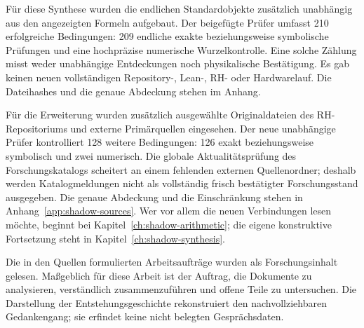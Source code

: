 \documentclass[11pt,a4paper,oneside,parskip=half,headings=normal]{scrreprt}
\begin{document}
Für diese Synthese wurden die endlichen Standardobjekte zusätzlich unabhängig aus den angezeigten Formeln aufgebaut. Der beigefügte Prüfer umfasst 210 erfolgreiche Bedingungen: 209 endliche exakte beziehungsweise symbolische Prüfungen und eine hochpräzise numerische Wurzelkontrolle. Eine solche Zählung misst weder unabhängige Entdeckungen noch physikalische Bestätigung. Es gab keinen neuen vollständigen Repository-, Lean-, RH- oder Hardwarelauf. Die Dateihashes und die genaue Abdeckung stehen im Anhang.

Für die Erweiterung wurden zusätzlich ausgewählte Originaldateien des RH-Repositoriums und externe Primärquellen eingesehen. Der neue unabhängige Prüfer kontrolliert 128 weitere Bedingungen: 126 exakt beziehungsweise symbolisch und zwei numerisch. Die globale Aktualitätsprüfung des Forschungskatalogs scheitert an einem fehlenden externen Quellenordner; deshalb werden Katalogmeldungen nicht als vollständig frisch bestätigter Forschungsstand ausgegeben. Die genaue Abdeckung und die Einschränkung stehen in Anhang~\ref{app:shadow-sources}. Wer vor allem die neuen Verbindungen lesen möchte, beginnt bei Kapitel~\ref{ch:shadow-arithmetic}; die eigene konstruktive Fortsetzung steht in Kapitel~\ref{ch:shadow-synthesis}.

Die in den Quellen formulierten Arbeitsaufträge wurden als Forschungsinhalt gelesen. Maßgeblich für diese Arbeit ist der Auftrag, die Dokumente zu analysieren, verständlich zusammenzuführen und offene Teile zu untersuchen. Die Darstellung der Entstehungsgeschichte rekonstruiert den nachvollziehbaren Gedankengang; sie erfindet keine nicht belegten Gesprächsdaten.

\tableofcontents
\clearpage
{}






















\appendix



\end{document}
